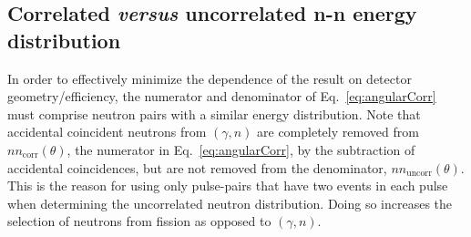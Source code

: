\subsection{Correlated \emph{versus} uncorrelated n-n energy distribution} 
\label{sec:n_n_erg_dist}
In order to effectively minimize the dependence of the result on detector geometry/efficiency, the numerator and denominator of Eq.~\ref{eq:angularCorr} must comprise neutron pairs with a similar energy distribution.
Note that accidental coincident neutrons from $(\gamma,n)$ are completely removed from $nn_{\text{corr}}(\theta)$, the numerator in Eq.~\ref{eq:angularCorr}, by the subtraction of accidental coincidences, but are not removed from the denominator, $nn_{\text{uncorr}}(\theta)$.
This is the reason for using only pulse-pairs that have two events in each pulse when determining the uncorrelated neutron distribution.
Doing so increases the selection of neutrons from fission as opposed to $(\gamma,n)$. 

